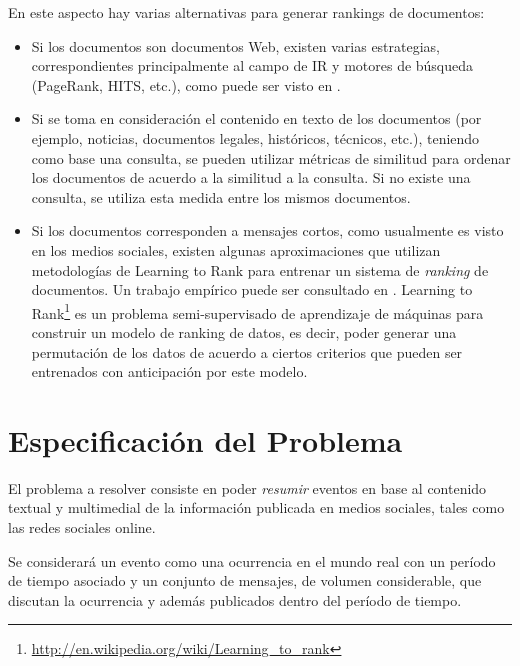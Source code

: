 \documentclass[upright, contnum]{umemoria}
\begin{document}
   En este aspecto hay varias alternativas para generar rankings de
   documentos: 

\begin{itemize}
\item Si los documentos son documentos Web, existen
     varias estrategias, correspondientes principalmente al campo de
     IR y motores de búsqueda (PageRank, HITS, etc.), como puede ser
     visto en \cite{signorini2005survey}.
\item Si se toma en consideración el contenido en texto de los
     documentos (por ejemplo, noticias, documentos legales,
     históricos, técnicos, etc.), teniendo como base una consulta, se
     pueden utilizar métricas de similitud para ordenar los documentos
     de acuerdo a la similitud a la consulta. Si no existe una
     consulta, se utiliza esta medida entre los mismos documentos.
\item Si los documentos corresponden a mensajes cortos, como usualmente
     es visto en los medios sociales, existen algunas aproximaciones
     que utilizan metodologías de Learning to Rank para entrenar un
     sistema de \emph{ranking} de documentos. Un trabajo empírico puede ser
     consultado en \cite{Duan:2010:ESL:1873781.1873815}. Learning to
     Rank\footnote{\href{http://en.wikipedia.org/wiki/Learning\_to\_rank}{http://en.wikipedia.org/wiki/Learning\_to\_rank} } 
     es un problema semi-supervisado de aprendizaje de
     máquinas para construir un modelo de ranking de datos, es decir,
     poder generar una permutación de los datos de acuerdo a ciertos
     criterios que pueden ser entrenados con anticipación por este
     modelo.
\end{itemize}
   
  
\chapter{Especificación del Problema}
\label{sec-3}

\label{cap:problema}

  El problema a resolver consiste en poder \emph{resumir} eventos en base
  al contenido textual y multimedial de la información publicada en
  medios sociales, tales como las redes sociales online.

  Se considerará un evento como una ocurrencia en el mundo real
  con un período de tiempo asociado y un conjunto de mensajes, de
  volumen considerable, que discutan la ocurrencia y además publicados
  dentro del período de tiempo. 
\end{document}
